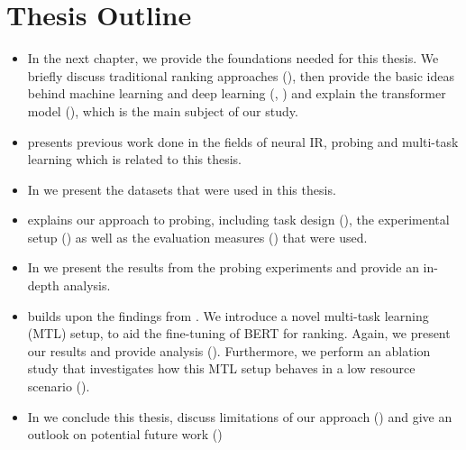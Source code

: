 \section{Thesis Outline}
\begin{itemize}
    \item In the next chapter, we provide the foundations needed for this thesis. We briefly discuss traditional ranking approaches (), then provide the basic ideas behind machine learning and deep learning (, ) and explain the transformer model (), which is the main subject of our study.
    \item {} presents previous work done in the fields of neural IR, probing and multi-task learning which is related to this thesis.
    \item In  we present the datasets that were used in this thesis.
    \item {} explains our approach to probing, including task design (), the experimental setup () as well as the evaluation measures () that were used.
    \item In  we present the results from the probing experiments and provide an in-depth analysis.
    \item {} builds upon the findings from . We introduce a novel multi-task learning (MTL) setup, to aid the fine-tuning of BERT for ranking. Again, we present our results and provide analysis (). Furthermore, we perform an ablation study that investigates how this MTL setup behaves in a low resource scenario ().
    \item In  we conclude this thesis, discuss limitations of our approach () and give an outlook on potential future work ()
\end{itemize}
